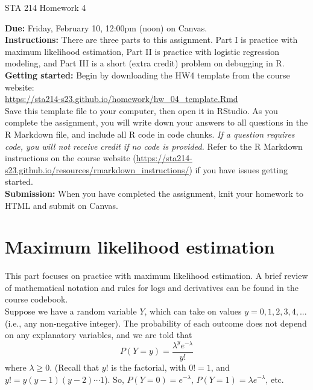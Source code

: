 \documentclass[11pt]{article}
\begin{document}
\begin{center}
\Large
STA 214 Homework 4\\
\normalsize
\vspace{5mm}
\end{center}

\noindent \textbf{Due:} Friday, February 10, 12:00pm (noon) on Canvas.\\ 

\noindent \textbf{Instructions:} There are three parts to this assignment. Part I is practice with maximum likelihood estimation, Part II is practice with logistic regression modeling, and Part III is a short (extra credit) problem on debugging in R.\\

\noindent \textbf{Getting started:} Begin by downloading the HW4 template from the course website:\\

\url{https://sta214-s23.github.io/homework/hw_04_template.Rmd}\\

\noindent Save this template file to your computer, then open it in RStudio. As you complete the assignment, you will write down your answers to all questions in the R Markdown file, and include all R code in code chunks. \textit{If a question requires code, you will not receive credit if no code is provided.} Refer to the R Markdown instructions on the course website (\url{https://sta214-s23.github.io/resources/rmarkdown_instructions/}) if you have issues getting started.\\

\noindent \textbf{Submission:} When you have completed the assignment, knit your homework to HTML and submit on Canvas.

\section{Maximum likelihood estimation}

This part focuses on practice with maximum likelihood estimation. A brief review of mathematical notation and rules for logs and derivatives can be found in the course codebook.\\

\noindent Suppose we have a random variable $Y$, which can take on values $y = 0, 1, 2, 3, 4,...$ (i.e., any non-negative integer). The probability of each outcome does not depend on any explanatory variables, and we are told that
$$P(Y = y) = \dfrac{\lambda^y e^{-\lambda}}{y!}$$
where $\lambda \geq 0$. (Recall that $y!$ is the factorial, with $0! = 1$, and $y! = y(y - 1)(y-2)\cdots 1$). So, $P(Y = 0) = e^{-\lambda}$, $P(Y = 1) = \lambda e^{-\lambda}$, etc.
\end{document}
